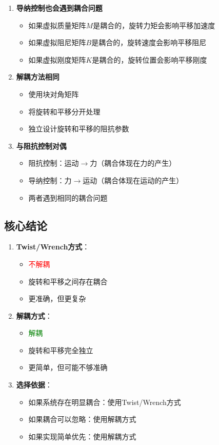 \documentclass[12pt,a4paper]{article}
\begin{document}
\begin{enumerate}
\item \textbf{导纳控制也会遇到耦合问题}
\begin{itemize}
\item 如果虚拟质量矩阵$M$是耦合的，旋转力矩会影响平移加速度
\item 如果虚拟阻尼矩阵$B$是耦合的，旋转速度会影响平移阻尼
\item 如果虚拟刚度矩阵$K$是耦合的，旋转位置会影响平移刚度
\end{itemize}

\item \textbf{解耦方法相同}
\begin{itemize}
\item 使用块对角矩阵
\item 将旋转和平移分开处理
\item 独立设计旋转和平移的阻抗参数
\end{itemize}

\item \textbf{与阻抗控制对偶}
\begin{itemize}
\item 阻抗控制：运动$\to$力（耦合体现在力的产生）
\item 导纳控制：力$\to$运动（耦合体现在运动的产生）
\item 两者遇到相同的耦合问题
\end{itemize}
\end{enumerate}

\subsection{核心结论}

\begin{enumerate}
\item \textbf{Twist/Wrench方式}：
\begin{itemize}
\item \textcolor{red}{不解耦}
\item 旋转和平移之间存在耦合
\item 更准确，但更复杂
\end{itemize}

\item \textbf{解耦方式}：
\begin{itemize}
\item \textcolor{green}{解耦}
\item 旋转和平移完全独立
\item 更简单，但可能不够准确
\end{itemize}

\item \textbf{选择依据}：
\begin{itemize}
\item 如果系统存在明显耦合：使用Twist/Wrench方式
\item 如果耦合可以忽略：使用解耦方式
\item 如果实现简单优先：使用解耦方式
\end{itemize}
\end{enumerate}
\end{document}
